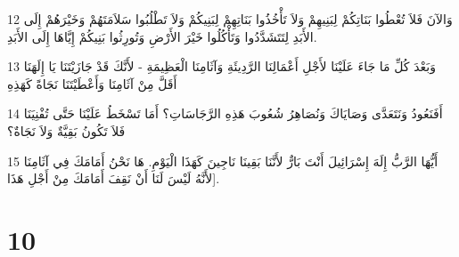 \par 12 وَالآنَ فَلاَ تُعْطُوا بَنَاتِكُمْ لِبَنِيهِمْ وَلاَ تَأْخُذُوا بَنَاتِهِمْ لِبَنِيكُمْ وَلاَ تَطْلُبُوا سَلاَمَتَهُمْ وَخَيْرَهُمْ إِلَى الأَبَدِ لِتَتَشَدَّدُوا وَتَأْكُلُوا خَيْرَ الأَرْضِ وَتُورِثُوا بَنِيكُمْ إِيَّاهَا إِلَى الأَبَدِ.
\par 13 وَبَعْدَ كُلِّ مَا جَاءَ عَلَيْنَا لأَجْلِ أَعْمَالِنَا الرَّدِيئَةِ وَآثَامِنَا الْعَظِيمَةِ - لأَنَّكَ قَدْ جَازَيْتَنَا يَا إِلَهَنَا أَقَلَّ مِنْ آثَامِنَا وَأَعْطَيْتَنَا نَجَاةً كَهَذِهِ
\par 14 أَفَنَعُودُ وَنَتَعَدَّى وَصَايَاكَ وَنُصَاهِرُ شُعُوبَ هَذِهِ الرَّجَاسَاتِ؟ أَمَا تَسْخَطُ عَلَيْنَا حَتَّى تُفْنِيَنَا فَلاَ تَكُونُ بَقِيَّةٌ وَلاَ نَجَاةٌ؟
\par 15 أَيُّهَا الرَّبُّ إِلَهَ إِسْرَائِيلَ أَنْتَ بَارٌّ لأَنَّنَا بَقِينَا نَاجِينَ كَهَذَا الْيَوْمِ. هَا نَحْنُ أَمَامَكَ فِي آثَامِنَا لأَنَّهُ لَيْسَ لَنَا أَنْ نَقِفَ أَمَامَكَ مِنْ أَجْلِ هَذَا].

\chapter{10}

